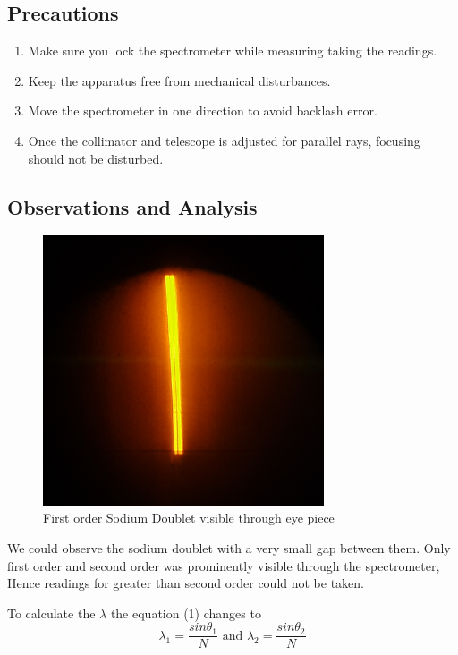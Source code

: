 \documentclass[a4paper, amsfonts, amssymb, amsmath, reprint, showkeys, nofootinbib, twoside]{revtex4-1}
\begin{document}
\subsection{Precautions}
\begin{enumerate}
\item{Make sure you lock the spectrometer while measuring taking the readings.}
\item{Keep the apparatus free from mechanical disturbances.}
\item{Move the spectrometer in one direction to avoid backlash error.}
\item{Once the collimator and telescope is adjusted for parallel rays, focusing should not be disturbed.}
\end{enumerate}

\subsection{Observations and Analysis}

\begin{figure}[H] %
	\centering
	\includegraphics[width=8.3cm]{3} 
	\caption{First order Sodium Doublet visible through eye piece}
	\label{1}
\end{figure}

We could observe the sodium doublet with a very small gap between them. Only first order and second order was prominently visible through the spectrometer, Hence readings for greater than second order could not be taken.   

To calculate the $\lambda$ the equation (1)  changes to 
\begin{equation}
	\lambda_1=\frac{sin \theta_1}{N} \text{ and } 	\lambda_2=\frac{sin \theta_2}{N}
\end{equation}
\end{document}
